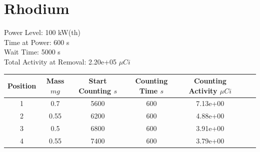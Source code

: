 \newpage

\section*{ Rhodium }

Power Level: 100 kW(th) \\
Time at Power: 600 s \\
Wait Time: 5000 s \\
Total Activity at Removal: 2.20e+05 $\mu Ci$

\begin{table}[h]
\centering
\begin{tabular}{ |c|c|c|c|c|c|c| }
 \hline
 Position & Mass $mg$ & Start Counting $s$ & Counting Time $s$ & Counting Activity $\mu Ci$ \\
 \hline 
 1 & 0.7 & 5600 & 600 & 7.13e+00\\ 
\hline
 2 & 0.55 & 6200 & 600 & 4.88e+00\\ 
\hline
 3 & 0.5 & 6800 & 600 & 3.91e+00\\ 
\hline
 4 & 0.55 & 7400 & 600 & 3.79e+00\\ 
\hline
\end{tabular}
\end{table}

\begin{figure}[!ht]
   \centering
   \quad
   \\ 
   \quad 

\end{figure}


